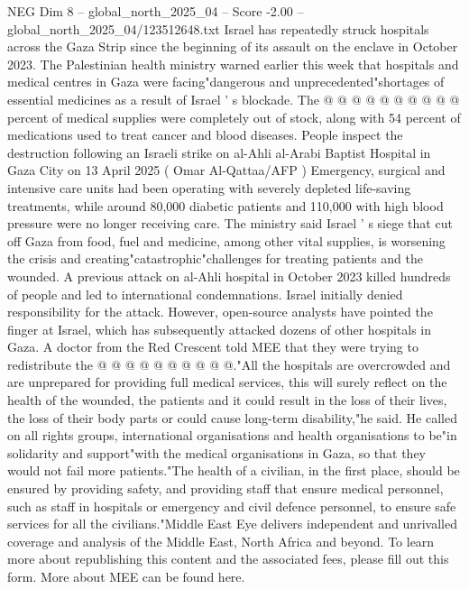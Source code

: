 \begin{textsample}{NEG Dim 8 – global\_north\_2025\_04 – Score -2.00 – global\_north\_2025\_04/123512648.txt}
Israel has repeatedly struck hospitals across the Gaza Strip since the beginning of its assault on the enclave in October 2023.
The Palestinian health ministry warned earlier this week that hospitals and medical centres in Gaza were facing"dangerous and unprecedented"shortages of essential medicines as a result of Israel ' s blockade.
The @ @ @ @ @ @ @ @ @ @ percent of medical supplies were completely out of stock, along with 54 percent of medications used to treat cancer and blood diseases.
People inspect the destruction following an Israeli strike on al-Ahli al-Arabi Baptist Hospital in Gaza City on 13 April 2025 ( Omar Al-Qattaa/AFP ) Emergency, surgical and intensive care units had been operating with severely depleted life-saving treatments, while around 80,000 diabetic patients and 110,000 with high blood pressure were no longer receiving care.
The ministry said Israel ' s siege that cut off Gaza from food, fuel and medicine, among other vital supplies, is worsening the crisis and creating"catastrophic"challenges for treating patients and the wounded.
A previous attack on al-Ahli hospital in October 2023 killed hundreds of people and led to international condemnations.
Israel initially denied responsibility for the attack.
However, open-source analysts have pointed the finger at Israel, which has subsequently attacked dozens of other hospitals in Gaza.
A doctor from the Red Crescent told MEE that they were trying to redistribute the @ @ @ @ @ @ @ @ @ @."All the hospitals are overcrowded and are unprepared for providing full medical services, this will surely reflect on the health of the wounded, the patients and it could result in the loss of their lives, the loss of their body parts or could cause long-term disability,"he said.
He called on all rights groups, international organisations and health organisations to be"in solidarity and support"with the medical organisations in Gaza, so that they would not fail more patients."The health of a civilian, in the first place, should be ensured by providing safety, and providing staff that ensure medical personnel, such as staff in hospitals or emergency and civil defence personnel, to ensure safe services for all the civilians."Middle East Eye delivers independent and unrivalled coverage and analysis of the Middle East, North Africa and beyond.
To learn more about republishing this content and the associated fees, please fill out this form.
More about MEE can be found here.

\end{textsample}
